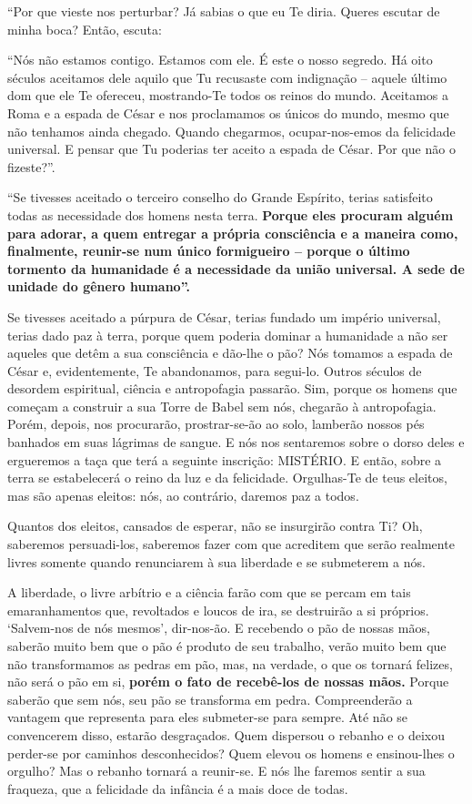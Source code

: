 ``Por que vieste nos perturbar? Já sabias o que eu Te diria. Queres
escutar de minha boca? Então, escuta:

``Nós não estamos contigo. Estamos com ele. É este o nosso segredo. Há
oito séculos aceitamos dele aquilo que Tu recusaste com indignação --
aquele último dom que ele Te ofereceu, mostrando-Te todos os reinos do
mundo. Aceitamos a Roma e a espada de César e nos proclamamos os únicos
do mundo, mesmo que não tenhamos ainda chegado. Quando chegarmos,
ocupar-nos-emos da felicidade universal. E pensar que Tu poderias ter
aceito a espada de César. Por que não o fizeste?''.

``Se tivesses aceitado o terceiro conselho do Grande Espírito, terias
satisfeito todas as necessidade dos homens nesta terra. \textbf{Porque
eles procuram alguém para adorar, a quem entregar a própria consciência
e a maneira como, finalmente, reunir-se num único formigueiro -- porque
o último tormento da humanidade é a necessidade da união universal. A
sede de unidade do gênero humano''.}

Se tivesses aceitado a púrpura de César, terias fundado um império
universal, terias dado paz à terra, porque quem poderia dominar a
humanidade a não ser aqueles que detêm a sua consciência e dão-lhe o
pão? Nós tomamos a espada de César e, evidentemente, Te abandonamos,
para segui-lo. Outros séculos de desordem espiritual, ciência e
antropofagia passarão. Sim, porque os homens que começam a construir a
sua Torre de Babel sem nós, chegarão à antropofagia. Porém, depois, nos
procurarão, prostrar-se-ão ao solo, lamberão nossos pés banhados em suas
lágrimas de sangue. E nós nos sentaremos sobre o dorso deles e
ergueremos a taça que terá a seguinte inscrição: MISTÉRIO. E então,
sobre a terra se estabelecerá o reino da luz e da felicidade.
Orgulhas-Te de teus eleitos, mas são apenas eleitos: nós, ao contrário,
daremos paz a todos.

Quantos dos eleitos, cansados de esperar, não se insurgirão contra Ti?
Oh, saberemos persuadi-los, saberemos fazer com que acreditem que serão
realmente livres somente quando renunciarem à sua liberdade e se
submeterem a nós.

A liberdade, o livre arbítrio e a ciência farão com que se percam em
tais emaranhamentos que, revoltados e loucos de ira, se destruirão a si
próprios. `Salvem-nos de nós mesmos', dir-nos-ão. E recebendo o pão de
nossas mãos, saberão muito bem que o pão é produto de seu trabalho,
verão muito bem que não transformamos as pedras em pão, mas, na verdade,
o que os tornará felizes, não será o pão em si, \textbf{porém o fato de
recebê-los de nossas mãos.} Porque saberão que sem nós, seu pão se
transforma em pedra. Compreenderão a vantagem que representa para eles
submeter-se para sempre. Até não se convencerem disso, estarão
desgraçados. Quem dispersou o rebanho e o deixou perder-se por caminhos
desconhecidos? Quem elevou os homens e ensinou-lhes o orgulho? Mas o
rebanho tornará a reunir-se. E nós lhe faremos sentir a sua fraqueza,
que a felicidade da infância é a mais doce de todas.

